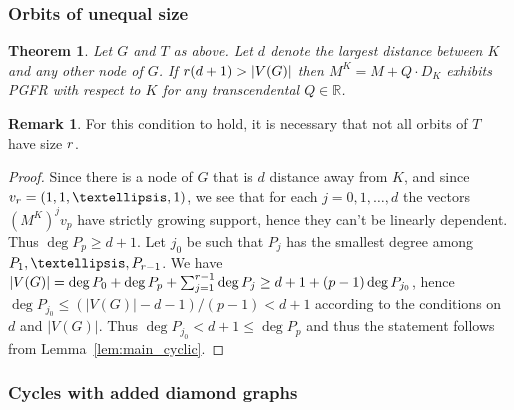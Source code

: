 \documentclass[11pt]{article}
\newtheorem{theorem}[theo]{Theorem}
\theoremstyle{definition}
\newtheorem{rema}[theo]{Remark}
\numberwithin{equation}{section}
\newcommand\+{\mkern2mu}
\newcommand{\R}{\mathbb{R}}
\newcommand{\1}{\mathbf 1}
\begin{document}
\subsubsection{Orbits of unequal size}

 \begin{theorem}\label{thm:main_psymm}
 Let $G$ and $T$ as above. Let $d$ denote the largest distance between $K$ and any other node of $G$. If $r(d+1) > |V(G)|$ then $M^K = M+Q\cdot D_K$ exhibits PGFR with respect to $K$ for any transcendental $Q \in \R$. 
  \end{theorem}
 
 \begin{rema}
 For this condition to hold, it is necessary that not all orbits of $T$ have size $r$. 
 \end{rema}
 
 \begin{proof}
 Since there is a node of $G$ that is $d$ distance away from $K$, and since $v_{\ord} = (1,1,\dots, 1)$, we see that for each $j = 0, 1, \dots, d$ the vectors $(M^K)^j v_p$ have strictly growing support, hence they can't be linearly dependent. Thus $\deg P_p \geq d+1$. Let $j_0$ be such that $P_j$ has the smallest degree among $P_1, \dots, P_{\ord-1}$.  We have $|V(G)|  = \deg P_0 + \deg P_p + \sum_{j=1}^{r-1} \deg P_j \geq d+1 + (p-1)\deg P_{j_0}$, hence $\deg P_{j_0} \leq (|V(G)|-d-1)/(p-1) < d+1$ according to the conditions on $d$ and $|V(G)|$. Thus $\deg P_{j_0} < d+1 \leq \deg P_p$ and thus the statement follows from Lemma~\ref{lem:main_cyclic}. 
 \end{proof}
 
\subsubsection{Cycles with added diamond graphs}
\end{document}
